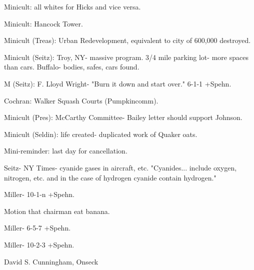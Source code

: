 \documentclass[12pt]{article}
\begin{document}
Minicult: all whites for Hicks and vice versa.

Minicult: Hancock Tower.

Minicult (Treas): Urban Redevelopment, equivalent to city of 600,000 destroyed.

Minicult (Seitz): Troy, NY- massive program. 3/4 mile parking lot- more spaces than cars. Buffalo- bodies, safes, cars found.

M (Seitz): F. Lloyd Wright- "Burn it down and start over." 6-1-1 +Spehn.

Cochran: Walker Squash Courts (Pumpkincomm).

Minicult (Pres): McCarthy Committee- Bailey letter should support Johnson.

Minicult (Seldin): life created- duplicated work of Quaker oats.

Mini-reminder: last day for cancellation.

Seitz- NY Times- cyanide gases in aircraft, etc. "Cyanides... include oxygen, nitrogen, etc. and in the case of hydrogen cyanide contain hydrogen."

Miller- 10-1-n +Spehn.

Motion that chairman eat banana.

Miller- 6-5-7 +Spehn.

Miller- 10-2-3 +Spehn.

\vspace{12pt}

\centerline{David S. Cunningham, Onseck}
\end{document}
